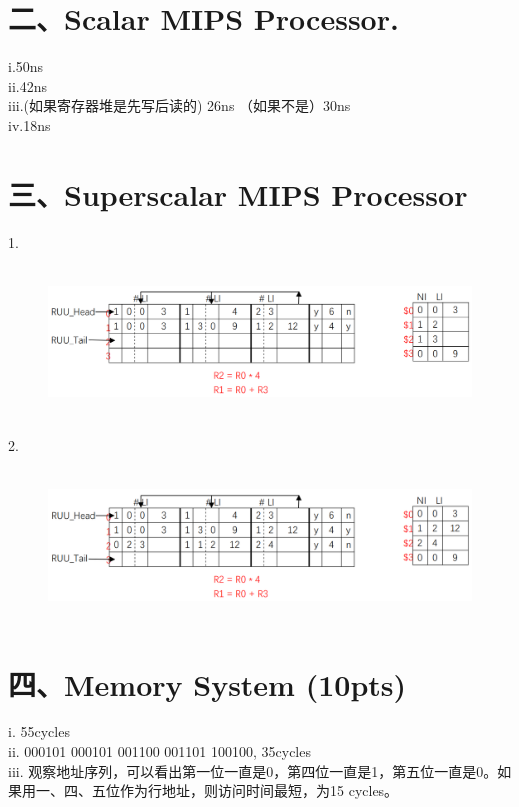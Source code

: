 \documentclass[UTF8]{ctexart}
\begin{document}
\section*{二、Scalar MIPS Processor. }
i.\quad 50ns\\
ii.\quad 42ns\\
iii.\quad (如果寄存器堆是先写后读的) 26ns （如果不是）30ns\\
iv.\quad 18ns
\section*{三、Superscalar MIPS Processor}
1.
\begin{figure}[H]                                            
    \centering                                                
    \includegraphics[width=14cm,height=4cm]{3-1-ans.png}        
    \caption*{}                                                                                 
\end{figure}  
2.
\begin{figure}[H]                                            
    \centering                                                
    \includegraphics[width=14cm,height=4cm]{3-2-ans.png}        
    \caption*{}                                                                                 
\end{figure}  
\section*{四、Memory System (10pts)}
i. 55cycles\\
ii. 000101 000101 001100 001101 100100, 35cycles\\
iii. 观察地址序列，可以看出第一位一直是0，第四位一直是1，第五位一直是0。如果用一、四、五位作为行地址，则访问时间最短，为15 cycles。\\
\end{document}
